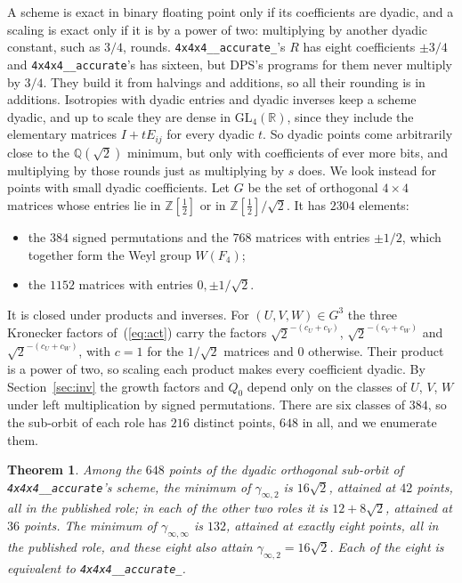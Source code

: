 \documentclass[11pt]{article}
\newtheorem{theorem}{Theorem}[section]
\theoremstyle{remark}
\newcommand{\Q}{\mathbb{Q}}
\newcommand{\Z}{\mathbb{Z}}
\newcommand{\Zh}{\Z[\tfrac12]}
\newcommand{\ginf}{\gamma_{\infty,2}}
\newcommand{\giinf}{\gamma_{\infty,\infty}}
\newcommand{\acc}{\texttt{4x4x4\_\allowbreak 48\_\allowbreak accurate}\xspace}
\newcommand{\acct}{\texttt{4x4x4\_\allowbreak 48\_\allowbreak accurate\_\allowbreak 262}\xspace}
\begin{document}
A scheme is exact in binary floating point only if its coefficients are
dyadic, and a scaling is exact only if it is by a power of two:
multiplying by another dyadic constant, such as $3/4$, rounds.  \acct's
$R$ has eight coefficients $\pm3/4$ and \acc's has sixteen, but DPS's
programs for them never multiply by $3/4$.  They build it from halvings
and additions, so all their rounding is in additions.  Isotropies with
dyadic entries and dyadic inverses keep a scheme dyadic, and up to scale
they are dense in $\mathrm{GL}_4(\mathbb{R})$, since they include the
elementary matrices $I+tE_{ij}$ for every dyadic $t$.  So dyadic points
come arbitrarily close to the $\Q(\sqrt2)$ minimum, but only with
coefficients of ever more bits, and multiplying by those rounds just as
multiplying by $s$ does.  We look instead for points with small dyadic
coefficients.  Let $G$ be
the set of orthogonal $4\times4$ matrices whose entries lie in $\Zh$ or
in $\Zh/\sqrt2$.  It has $2304$ elements:
\begin{itemize}
\item the $384$ signed permutations and the $768$ matrices with entries
  $\pm1/2$, which together form the Weyl group $W(F_4)$;
\item the $1152$ matrices with entries $0,\pm1/\sqrt2$.
\end{itemize}
It is closed under products and inverses.  For $(U,V,W)\in G^3$ the
three Kronecker factors of~(\ref{eq:act}) carry the factors
$\sqrt2^{-(c_U+c_V)}$, $\sqrt2^{-(c_V+c_W)}$ and $\sqrt2^{-(c_U+c_W)}$,
with $c=1$ for the $1/\sqrt2$ matrices and $0$ otherwise.  Their product
is a power of two, so scaling each product makes every coefficient
dyadic.  By Section~\ref{sec:inv} the growth factors and $Q_0$ depend
only on the classes of $U$, $V$, $W$ under left multiplication by signed
permutations.  There are six classes of $384$, so the sub-orbit of each
role has $216$ distinct points, $648$ in all, and we enumerate them.

\begin{theorem}\label{thm:dyadic}
Among the $648$ points of the dyadic orthogonal sub-orbit of \acc's
scheme, the minimum of $\ginf$ is $16\sqrt2$, attained at $42$ points,
all in the published role; in each of the other two roles it is
$12+8\sqrt2$, attained at $36$ points.
The minimum of $\giinf$ is $132$, attained at exactly eight points, all
in the published role, and these eight also attain $\ginf=16\sqrt2$.
Each of the eight is equivalent to \acct.
\end{theorem}
\end{document}
